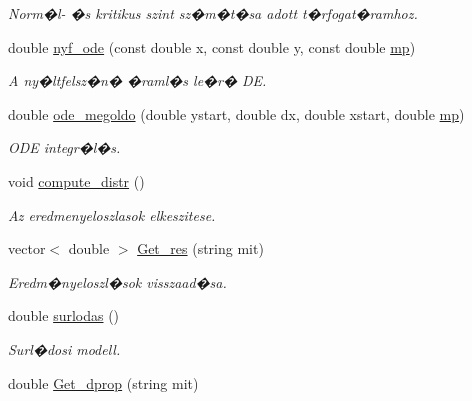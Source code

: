 \begin{DoxyCompactItemize}
\begin{DoxyCompactList}\small\item\em Norm�l-\/ �s kritikus szint sz�m�t�sa adott t�rfogat�ramhoz. \end{DoxyCompactList}\item 
double \hyperlink{class_csatorna_aacea0461de03c4592e89cee026c2e1d5}{nyf\+\_\+ode} (const double x, const double y, const double \hyperlink{class_agelem_a1377d80d8511cc4adacccba31d28282d}{mp})
\begin{DoxyCompactList}\small\item\em A ny�ltfelsz�n� �raml�s le�r� DE. \end{DoxyCompactList}\item 
double \hyperlink{class_csatorna_a17e55cbde88d58985f7e315e7069ba3a}{ode\+\_\+megoldo} (double ystart, double dx, double xstart, double \hyperlink{class_agelem_a1377d80d8511cc4adacccba31d28282d}{mp})
\begin{DoxyCompactList}\small\item\em O\+DE integr�l�s. \end{DoxyCompactList}\item 
void \hyperlink{class_csatorna_a2ad82029529f1aa2b4da3122b608eb6c}{compute\+\_\+distr} ()
\begin{DoxyCompactList}\small\item\em Az eredmenyeloszlasok elkeszitese. \end{DoxyCompactList}\item 
vector$<$ double $>$ \hyperlink{class_csatorna_ab515ee9bcf30c35c22b23fd0617cc422}{Get\+\_\+res} (string mit)\hypertarget{class_csatorna_ab515ee9bcf30c35c22b23fd0617cc422}{}\label{class_csatorna_ab515ee9bcf30c35c22b23fd0617cc422}

\begin{DoxyCompactList}\small\item\em Eredm�nyeloszl�sok visszaad�sa. \end{DoxyCompactList}\item 
double \hyperlink{class_csatorna_a8ca44a377b12883ddad100f0dea9aed2}{surlodas} ()\hypertarget{class_csatorna_a8ca44a377b12883ddad100f0dea9aed2}{}\label{class_csatorna_a8ca44a377b12883ddad100f0dea9aed2}

\begin{DoxyCompactList}\small\item\em Surl�dosi modell. \end{DoxyCompactList}\item 
double \hyperlink{class_csatorna_a581b69e57becd825b645f07b07028051}{Get\+\_\+dprop} (string mit)\hypertarget{class_csatorna_a581b69e57becd825b645f07b07028051}{}\label{class_csatorna_a581b69e57becd825b645f07b07028051}


\end{DoxyCompactItemize}
